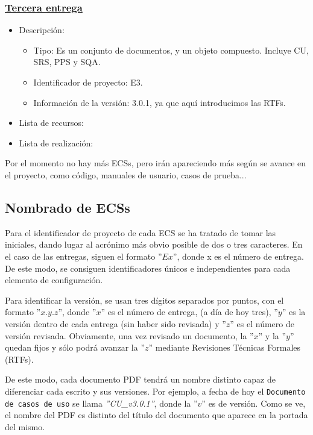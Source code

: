 \documentclass[spanish,a4paper,11pt, twoside]{report}	%
\begin{document}
			\subsubsection{\underline{Tercera entrega}}
			\begin{itemize}	
				\item{Descripción:}
					\begin{itemize}	
						\item{Tipo:} Es un conjunto de documentos, y un objeto compuesto. Incluye CU, SRS, PPS y SQA. 
						\item{Identificador de proyecto:} E3.
						\item{Información de la versión:} 3.0.1, ya que aquí introducimos las RTFs.
					\end{itemize}	
				\item{Lista de recursos:}
				\item{Lista de realización:}
			\end{itemize}	

			Por el momento no hay más ECSs, pero irán apareciendo más según se avance en el proyecto, como código, manuales de usuario, casos de prueba...

		\subsection{Nombrado de ECSs}

		Para el identificador de proyecto de cada ECS se ha tratado de tomar las iniciales, dando lugar al acrónimo más obvio posible de dos o tres caracteres. En el caso de las entregas, siguen el formato ''$Ex$'', donde x es el número de entrega. De este modo, se consiguen identificadores únicos e independientes para cada elemento de configuración.

		Para identificar la versión, se usan tres dígitos separados por puntos, con el formato ''$x.y.z$'', donde ''$x$'' es el número de entrega, (a día de hoy tres), ''$y$'' es la versión dentro de cada entrega (sin haber sido revisada) y ''$z$'' es el número de versión revisada. Obviamente, una vez revisado un documento, la ''$x$'' y la ''$y$'' quedan fijos y sólo podrá avanzar la ''$z$'' mediante Revisiones Técnicas Formales (RTFs).
		
		De este modo, cada documento PDF tendrá un nombre distinto capaz de diferenciar cada escrito y sus versiones. Por ejemplo, a fecha de hoy el \texttt{Documento de casos de uso} se llama \textit{''CU\_v3.0.1''}, donde la ''$v$'' es de versión. Como se ve, el nombre del PDF es distinto del título del documento que aparece en la portada del mismo.
\end{document}
